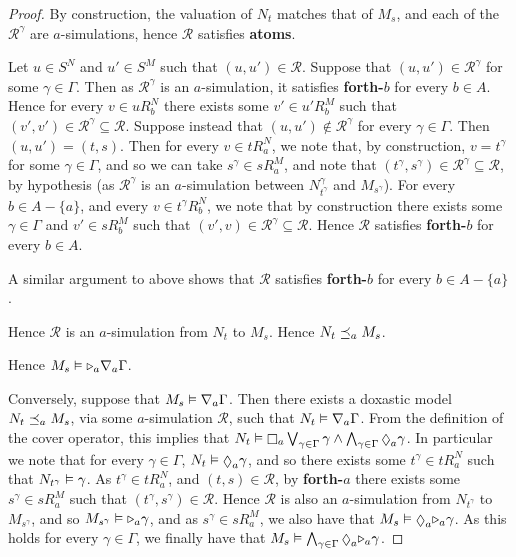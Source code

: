 \begin{proof}
By construction, the valuation of $N_t$ matches that of $M_s$, and each of the
$\mathcal{R}^\gamma$ are $a$-simulations, hence $\mathcal{R}$ satisfies {\bf
atoms}.

Let $u \in S^N$ and $u' \in S^M$ such that $(u, u') \in \mathcal{R}$. Suppose
that $(u, u') \in \mathcal{R}^\gamma$ for some $\gamma \in \Gamma$. Then as
$\mathcal{R}^\gamma$ is an $a$-simulation, it satisfies {\bf forth-$b$} for
every $b \in A$. Hence for every $v \in uR^N_b$ there exists some $v' \in
u'R^M_b$ such that $(v', v') \in \mathcal{R}^\gamma \subseteq \mathcal{R}$.
Suppose instead that $(u, u') \notin \mathcal{R}^\gamma$ for every $\gamma \in
\Gamma$. Then $(u, u') = (t, s)$. Then for every $v \in tR^N_a$, we note that,
by construction, $v = t^\gamma$ for some $\gamma \in \Gamma$, and so we can take
$s^\gamma \in sR^M_a$, and note that $(t^\gamma, s^\gamma) \in
\mathcal{R}^\gamma \subseteq \mathcal{R}$, by hypothesis (as
$\mathcal{R}^\gamma$ is an $a$-simulation between $N^\gamma_{t^\gamma}$ and
$M_{s^\gamma}$). For every $b \in A - \{a\}$, and every $v \in t^\gamma R^N_b$,
we note that by construction there exists some $\gamma \in \Gamma$ and $v' \in
sR^M_b$ such that $(v', v) \in \mathcal{R}^\gamma \subseteq \mathcal{R}$. Hence
$\mathcal{R}$ satisfies {\bf forth-$b$} for every $b \in A$.

A similar argument to above shows that $\mathcal{R}$ satisfies {\bf forth-$b$}
for every $b \in A - \{a\}$.

Hence $\mathcal{R}$ is an $a$-simulation from $N_t$ to $M_s$. Hence $N_t
\preceq_a M_s$.

Hence $M_s \vDash {\ensuremath{\mathopen{\triangleright}}}_a \nabla_a \Gamma$.

Conversely, suppose that $M_s \vDash \nabla_a \Gamma$. Then there exists a
doxastic model $N_t \preceq_a M_s$, via some $a$-simulation $\mathcal{R}$,
such that $N_t \vDash \nabla_a \Gamma$. From the definition of the cover
operator, this implies that $N_t \entails \knows_a \bigvee_{\gamma \in \Gamma}
\gamma \land \bigwedge_{\gamma \in \Gamma} \suspects_a \gamma$. In particular we
note that for every $\gamma \in \Gamma$, $N_t \entails \suspects_a \gamma$, and
so there exists some $t^\gamma \in tR^N_a$ such that $N_{t^\gamma} \vDash
\gamma$. As $t^\gamma \in tR^N_a$, and $(t, s) \in \mathcal{R}$, by {\bf
forth-$a$} there exists some $s^\gamma \in sR^M_a$ such that $(t^\gamma, s^\gamma)
\in \mathcal{R}$. Hence $\mathcal{R}$ is also an $a$-simulation from
$N_{t^\gamma}$ to $M_{s^\gamma}$, and so $M_{s^\gamma} \vDash {\ensuremath{\mathopen{\triangleright}}}_a
\gamma$, and as $s^\gamma \in sR^M_a$, we also have that $M_s \entails \suspects_a
\somerefs_a \gamma$. As this holds for every $\gamma \in \Gamma$, we finally
have that $M_s \entails \bigwedge_{\gamma \in \Gamma} \suspects_a \somerefs_a
\gamma$.


\end{proof}

